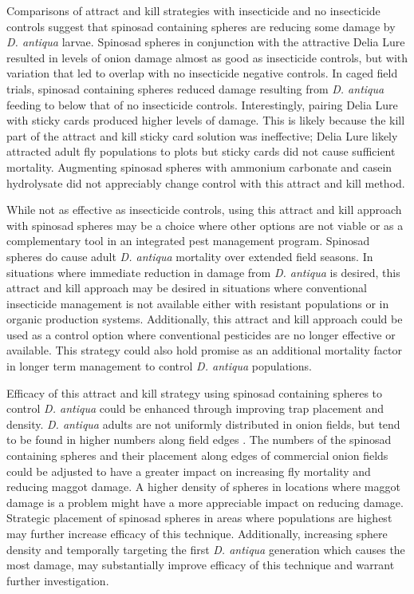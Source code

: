 \documentclass[alpha-refs]{wiley-article}
\begin{document}
Comparisons of attract and kill strategies with insecticide and no insecticide controls suggest that spinosad containing spheres are reducing some damage by \textit{D. antiqua} larvae.  Spinosad spheres in conjunction with the attractive Delia Lure resulted in levels of onion damage almost as good as insecticide controls, but with variation that led to overlap with no insecticide negative controls.  In caged field trials, spinosad containing spheres reduced damage resulting from \textit{D. antiqua} feeding to below that of no insecticide controls.  Interestingly, pairing Delia Lure with sticky cards produced higher levels of damage.  This is likely because the kill part of the attract and kill sticky card solution was ineffective; Delia Lure likely attracted adult fly populations to plots but sticky cards did not cause sufficient mortality.  Augmenting spinosad spheres with ammonium carbonate and casein hydrolysate did not appreciably change control with this attract and kill method.  

While not as effective as insecticide controls, using this attract and kill approach with spinosad spheres may be a choice where other options are not viable or as a complementary tool in an integrated pest management program.  Spinosad spheres do cause adult \textit{D. antiqua} mortality over extended field seasons.  In situations where immediate reduction in damage from \textit{D. antiqua} is desired, this attract and kill approach may be desired in situations where conventional insecticide management is not available either with resistant populations or in organic production systems.  Additionally, this attract and kill approach could be used as a control option where conventional pesticides are no longer effective or available. This strategy could also hold promise as an additional mortality factor in longer term management to control \textit{D. antiqua} populations.  

Efficacy of this attract and kill strategy using spinosad containing spheres to control \textit{D. antiqua} could be enhanced through improving trap placement and density.  \textit{D. antiqua} adults are not uniformly distributed in onion fields, but tend to be found in higher numbers along field edges \citep{werling2006spatial}.  The numbers of the spinosad containing spheres and their placement along edges of commercial onion fields could be adjusted to have a greater impact on increasing fly mortality and reducing maggot damage.  A higher density of spheres in locations where maggot damage is a problem might have a more appreciable impact on reducing damage. Strategic placement of spinosad spheres in areas where populations are highest may further increase efficacy of this technique.  Additionally, increasing sphere density and temporally targeting the first \textit{D. antiqua} generation which causes the most damage, may substantially improve efficacy of this technique and warrant further investigation.  
\end{document}
